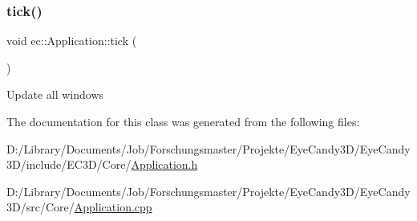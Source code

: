 \subsubsection{\texorpdfstring{tick()}{tick()}}
{\footnotesize\ttfamily void ec\+::\+Application\+::tick (\begin{DoxyParamCaption}{ }\end{DoxyParamCaption})\hspace{0.3cm}{\ttfamily [virtual]}}

Update all windows 

The documentation for this class was generated from the following files\+:\begin{DoxyCompactItemize}
\item 
D\+:/\+Library/\+Documents/\+Job/\+Forschungsmaster/\+Projekte/\+Eye\+Candy3\+D/\+Eye\+Candy3\+D/include/\+E\+C3\+D/\+Core/\mbox{\hyperlink{_application_8h}{Application.\+h}}\item 
D\+:/\+Library/\+Documents/\+Job/\+Forschungsmaster/\+Projekte/\+Eye\+Candy3\+D/\+Eye\+Candy3\+D/src/\+Core/\mbox{\hyperlink{_application_8cpp}{Application.\+cpp}}\end{DoxyCompactItemize}
